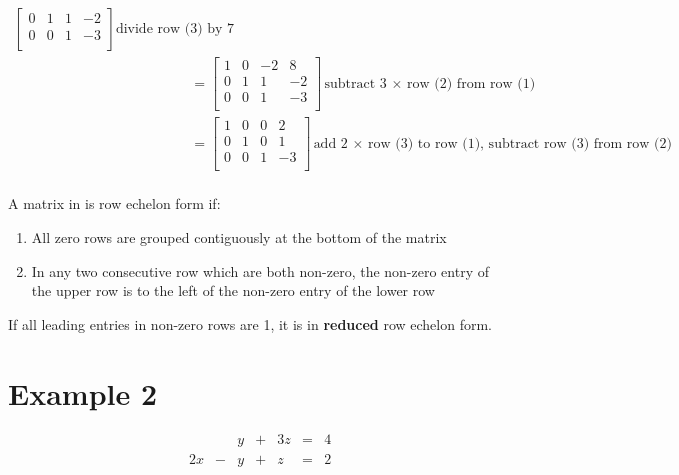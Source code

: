 \documentclass{article}
\theoremstyle{mytheoremstyle}
\theoremstyle{mytheoremstyle}
\theoremstyle{myproblemstyle}
\begin{document}
\begin{align*}
\begin{bmatrix}
            0 & 1 & 1 & -2 \\
            0 & 0 & 1 & -3 \\
        \end{bmatrix} \text{divide row (3) by 7}\\
        &=\begin{bmatrix}
            1 & 0 &-2 & 8 \\
            0 & 1 & 1 & -2 \\
            0 & 0 & 1 & -3 \\
        \end{bmatrix} \text{subtract 3 $\times$ row (2) from row (1)}\\
        &=\begin{bmatrix}
            1 & 0 & 0 & 2 \\
            0 & 1 & 0 & 1 \\
            0 & 0 & 1 & -3 \\
        \end{bmatrix} \text{add 2 $\times$ row (3) to row (1),
                            subtract row (3) from row (2)}\\
    \end{align*}
    \pagebreak

    A matrix in is row echelon form if:
    \begin{enumerate}
        \item All zero rows are grouped contiguously at the bottom of the matrix

        \item In any two consecutive row which are both non-zero, the non-zero
            entry of the upper row is to the left of the non-zero entry of the
            lower row
    \end{enumerate}
    If all leading entries in non-zero rows are 1, it is in \textbf{reduced} row
    echelon form.

    \section*{Example 2}
    \begin{equation*}
        \begin{matrix}
               & & y &+& 3z &=& 4 \\
            2x &-& y &+& z  &=& 2
        \end{matrix}
    \end{equation*}
\end{document}
